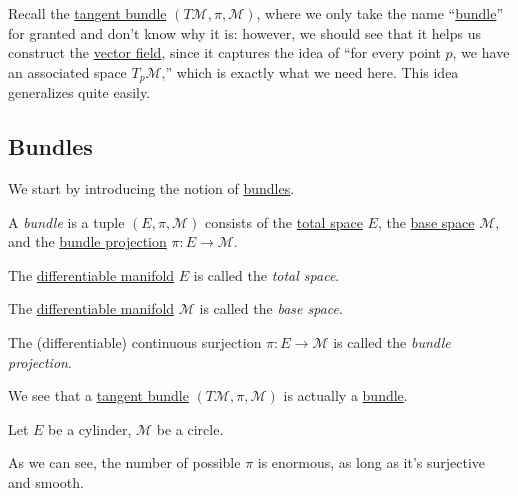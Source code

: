 Recall the \hyperref[def:tangent-bundle]{tangent bundle} \((T\mathcal{M} , \pi , \mathcal{M} )\), where we only take the name ``\hyperref[def:bundle]{bundle}'' for granted and don't know why it is: however, we should see that it helps us construct the \hyperref[def:vector-field]{vector field}, since it captures the idea of ``for every point \(p\), we have an associated space \(T_p \mathcal{M} \),'' which is exactly what we need here. This idea generalizes quite easily.

\subsection{Bundles}
We start by introducing the notion of \hyperref[def:bundle]{bundles}.

\begin{definition}[Bundle]\label{def:bundle}
	A \emph{bundle} is a tuple \((E, \pi , \mathcal{M} )\) consists of the \hyperref[def:vector-bundle-total-space]{total space} \(E\), the \hyperref[def:base-space]{base space} \(\mathcal{M} \), and the \hyperref[def:bundle-projection]{bundle projection} \(\pi \colon E \to \mathcal{M} \).
	\begin{definition}\label{def:vector-bundle-total-space}
		The \hyperref[def:smooth-manifold]{differentiable manifold} \(E\) is called the \emph{total space}.
	\end{definition}

	\begin{definition}\label{def:base-space}
		The \hyperref[def:smooth-manifold]{differentiable manifold} \(\mathcal{M} \) is called the \emph{base space}.
	\end{definition}

	\begin{definition}\label{def:bundle-projection}
		The (differentiable) continuous surjection \(\pi \colon E\to \mathcal{M} \) is called the \emph{bundle projection}.
	\end{definition}
\end{definition}

\begin{note}
	We see that a \hyperref[def:tangent-bundle]{tangent bundle} \((T\mathcal{M} , \pi , \mathcal{M} )\) is actually a \hyperref[def:bundle]{bundle}.
\end{note}

\begin{eg}
	Let \(E\) be a cylinder, \(\mathcal{M} \) be a circle.

	\begin{center}
	\end{center}
	As we can see, the number of possible \(\pi \) is enormous, as long as it's surjective and smooth.
\end{eg}

